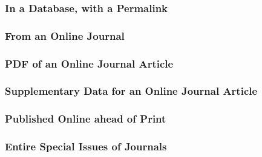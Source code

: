 \documentclass{ltxdockit}
\begin{document}
\subsubsection{In a Database, with a Permalink} %
\label{sub:in_a_database_with_a_permalink}
\begin{refsection}
	\printbibliography[heading=none]
\end{refsection}
\subsubsection{From an Online Journal} %
\label{sub:from_an_online_journal}
\begin{refsection}
	\printbibliography[heading=none]
\end{refsection}
\subsubsection{PDF of an Online Journal Article} %
\label{sub:pdf_of_an_online_journal_article}
\begin{refsection}
	\printbibliography[heading=none]
\end{refsection}
\subsubsection{Supplementary Data for an Online Journal Article} %
\label{sub:supplementary_data_for_an_online_journal_article}
\begin{refsection}
	\printbibliography[heading=none]
\end{refsection}
\subsubsection{Published Online ahead of Print} %
\label{sub:published_online_ahead_of_print}
\begin{refsection}
	\printbibliography[heading=none]
\end{refsection}
\subsubsection{Entire Special Issues of Journals} %
\label{sub:entire_special_issues_of_journals}
\begin{refsection}
	\printbibliography[heading=none]
\end{refsection}
\end{document}
